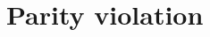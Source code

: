 \documentclass[../main.tex]{subfiles}
\begin{document}
\section{Parity violation}%
\label{sec:parity_violation}
\end{document}
